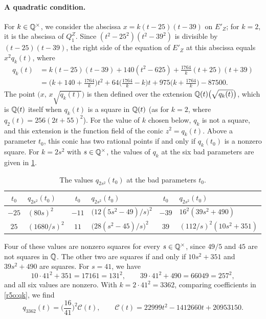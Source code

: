 \paragraph{A quadratic condition.} For $k\in\mathbb Q^\times$, we consider the abscissa $x=k(t-25)(t-39)$ on $E'_Z$; for $k=2$, it is the abscissa of $Q^Z_1$. Since $(t^2-25^2)(t^2-39^2)$ is divisible by $(t-25)(t-39)$, the right side of the equation of $E'_Z$ at this abscissa equals $x^2q_k(t)$, where
\begin{equation}\label{r5o:qk}
\begin{aligned}
q_k(t)&=k(t-25)(t-39)+140(t^2-625)+\frac{1764}k(t+25)(t+39)\\
&=\Big(k+140+\frac{1764}k\Big)t^2+64\Big(\frac{1764}k-k\Big)t+975\Big(k+\frac{1764}k\Big)-87500.
\end{aligned}
\end{equation}
The point $\big(x,\,x\sqrt{q_k(t)}\big)$ is then defined over the extension $\mathbb Q(t)\big(\sqrt{q_k(t)}\big)$, which is $\mathbb Q(t)$ itself when $q_k(t)$ is a square in $\mathbb Q(t)$ (as for $k=2$, where $q_2(t)=256(2t+55)^2$). For the value of $k$ chosen below, $q_k$ is not a square, and this extension is the function field of the conic $z^2=q_k(t)$. Above a parameter $t_0$, this conic has two rational points if and only if $q_k(t_0)$ is a nonzero square. For $k=2s^2$ with $s\in\mathbb Q^\times$, the values of $q_k$ at the six bad parameters are given in \cref{tab:r5o-values}.

\begin{table}[htbp]
\centering
\caption{The values $q_{2s^2}(t_0)$ at the bad parameters $t_0$.}\label{tab:r5o-values}
\begin{tabular}{cl@{\qquad}cl@{\qquad}cl}
\toprule
$t_0$ & $q_{2s^2}(t_0)$ & $t_0$ & $q_{2s^2}(t_0)$ & $t_0$ & $q_{2s^2}(t_0)$\\
\midrule
$-25$ & $(80s)^2$ & $-11$ & $\big(12(5s^2-49)/s\big)^2$ & $-39$ & $16^2(39s^2+490)$\\
$25$ & $(1680/s)^2$ & $11$ & $\big(28(s^2-45)/s\big)^2$ & $39$ & $(112/s)^2(10s^2+351)$\\
\bottomrule
\end{tabular}
\end{table}

Four of these values are nonzero squares for every $s\in\mathbb Q^\times$, since $49/5$ and $45$ are not squares in $\mathbb Q$. The other two are squares if and only if $10s^2+351$ and $39s^2+490$ are squares. For $s=41$, we have
\[
10\cdot41^2+351=17161=131^2,\qquad 39\cdot41^2+490=66049=257^2,
\]
and all six values are nonzero. With $k=2\cdot41^2=3362$, comparing coefficients in \eqref{r5o:qk}, we find
\[
q_{3362}(t)=\Big(\frac{16}{41}\Big)^2\mathcal C(t),\qquad \mathcal C(t)=22999t^2-1412660t+20953150.
\]

